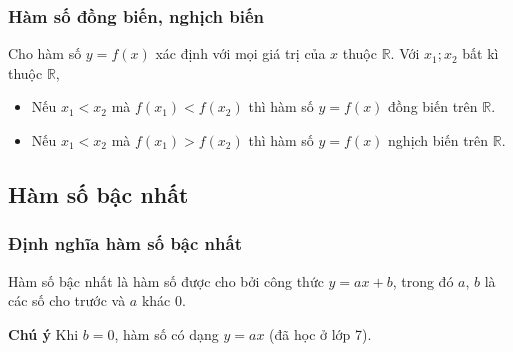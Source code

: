 \subsubsection{Hàm số đồng biến, nghịch biến}
	Cho hàm số $y = f(x)$ xác định với mọi giá trị của $x$ thuộc $\mathbb{R}$. Với $x_1;x_2$ bất kì thuộc $\mathbb{R}$,
\begin{itemize}
	\item Nếu $ x_1<x_2$ mà  $ f(x_1)< f(x_2)$  thì hàm số $y = f(x)$ đồng biến trên $\mathbb{R}$.
	\item Nếu $ x_1<x_2$  mà $ f(x_1)> f(x_2)$   thì hàm số $y = f(x)$ nghịch biến trên $\mathbb{R}$.
\end{itemize}


\subsection{Hàm số bậc nhất}
\subsubsection{Định nghĩa hàm số bậc nhất} Hàm số bậc nhất là hàm số được cho bởi công thức $y=ax+b$, trong đó $a$, $b$ là các số cho trước và $a$ khác $0$.
\begin{note}
	\textbf{Chú ý} Khi $b=0$, hàm số có dạng $y=ax$  (đã học ở lớp 7).
\end{note}

